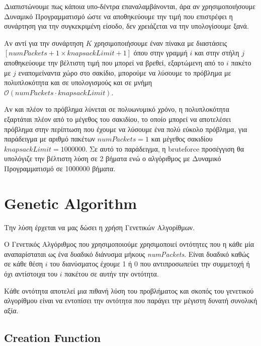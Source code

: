 \documentclass{article}
\begin{document}
Διαπιστώνουμε πως κάποια υπο-δέντρα επαναλαμβάνονται, άρα αν χρησιμοποιήσουμε
Δυναμικό Προγραμματισμό ώστε να αποθηκεύουμε την τιμή που επιστρέφει η συνάρτηση
για την συγκεκριμένη είσοδο, δεν χρειάζεται να την υπολογίσουμε ξανά.

\begin{sloppypar}
Αν αντί για την συνάρτηση $K$ χρησιμοποιήσουμε έναν πίνακα με διαστάσεις
$\left[\allowbreak \textit{numPackets}+1 \times \textit{knapsackLimit}+1\right]$
όπου στην γραμμή $i$ και στην στήλη $j$ αποθηκεύουμε την βέλτιστη τιμή που
μπορεί να βρεθεί, εξαρτώμενη από το $i$ πακέτο με $j$ εναπομείναντα χώρο στο
σακίδιο, μπορούμε να λύσουμε το πρόβλημα με πολυπλοκότητα και σε υπολογισμούς
και σε μνήμη $\mathcal{O}\left(\textit{numPackets} \cdot
\textit{knapsackLimit}\right)$.
\end{sloppypar}

\begin{sloppypar}
Αν και πλέον το πρόβλημα λύνεται σε πολυωνυμικό χρόνο, η πολυπλοκότητα εξαρτάται
πλέον από το μέγεθος του σακιδίου, το οποίο μπορεί να αποτελέσει πρόβλημα στην
περίπτωση που έχουμε να λύσουμε ένα πολύ εύκολο πρόβλημα, για παράδειγμα με
αριθμό πακέτων $\textit{numPackets} = 1$ και μέγεθος σακιδίου
$\textit{knapsackLimit} = 1000000$. Σε αυτό το παράδειγμα, η bruteforce
προσέγγιση θα υπολόγιζε την βέλτιστη λύση σε 2 βήματα ενώ ο αλγόριθμος με
Δυναμικό Προγραμματισμό σε 1000000 βήματα.
\end{sloppypar}

\section{Genetic Algorithm}

Την λύση έρχεται να μας δώσει η χρήση Γενετικών Αλγορίθμων.

Ο Γενετικός Αλγόριθμος που χρησιμοποιούμε χρησιμοποιεί οντότητες που η κάθε μία
αναπαρίσταται ως ένα δυαδικό διάνυσμα μήκους \textit{numPackets}. Είναι δυαδικό
καθώς σε κάθε θέση $i$ του διανύσματος έχουμε 1 ή 0 που αντιπροσωπεύει την
συμμετοχή ή όχι αντίστοιχα του $i$ πακέτου σε αυτήν την οντότητα.

Κάθε οντότητα αποτελεί μια πιθανή λύση του προβλήματος και σκοπός του γενετικού
αλγορίθμου είναι να εντοπίσει την οντότητα που παράγει την μέγιστη δυνατή
συνολική αξία.

\subsection{Creation Function}
\end{document}
